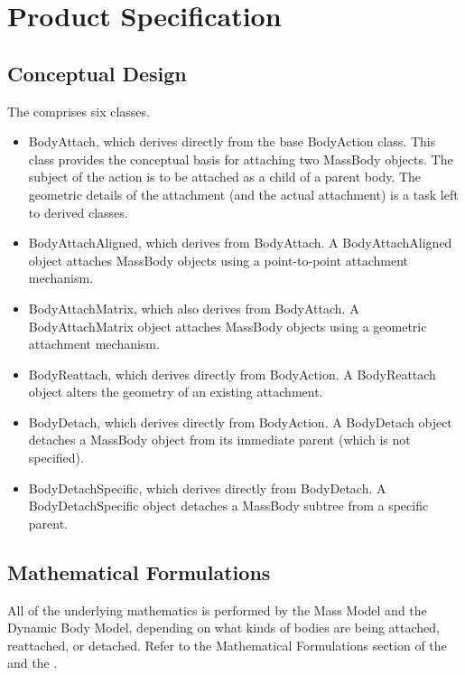 %

\chapter{Product Specification}\label{ch:\modelpartid:spec}

\section{Conceptual Design}
The \partxname comprises six classes.
\begin{itemize}
\item BodyAttach, which derives directly from the base BodyAction class.
This class provides the conceptual basis for attaching two MassBody objects.
The subject of the action is to be attached as a child of a parent body.
The geometric details of the attachment (and the actual attachment) is a task
left to derived classes.
\item BodyAttachAligned, which derives from BodyAttach.
A BodyAttachAligned object attaches MassBody objects using a point-to-point
attachment mechanism.
\item BodyAttachMatrix, which also derives from BodyAttach.
A BodyAttachMatrix object attaches MassBody objects using a geometric
attachment mechanism.
\item BodyReattach, which derives directly from BodyAction.
A BodyReattach object alters the geometry of an existing attachment.
\item BodyDetach, which derives directly from BodyAction.
A BodyDetach object detaches a MassBody object from its immediate
parent (which is not specified).
\item BodyDetachSpecific, which derives directly from BodyDetach.
A BodyDetachSpecific object detaches a MassBody subtree from a
specific parent.
\end{itemize}

\section{Mathematical Formulations}
All of the underlying mathematics is performed by the Mass Model
and the Dynamic Body Model, depending on what kinds of bodies are
being attached, reattached, or detached.
Refer to the Mathematical Formulations section of
the 
and the .

